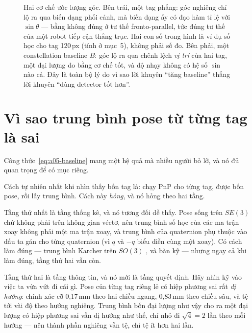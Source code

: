 \documentclass[../../marker.tex]{subfiles}
\begin{document}
\begin{figure}[H]
\caption{Hai cơ chế ước lượng góc. Bên trái, một tag phẳng: góc nghiêng chỉ lộ ra qua biến dạng phối cảnh, mà biến dạng ấy có đạo hàm tỉ lệ với \(\sin\theta\) --- bằng không đúng ở tư thế fronto-parallel, tức đúng tư thế của một robot tiếp cận thẳng trục. Hai con số trong hình là ví dụ số học cho tag 120\,px (tính ở mục~5), không phải số đo. Bên phải, một constellation baseline \(B\): góc lộ ra qua chênh lệch \emph{vị trí} của hai tag, một đại lượng đo bằng cơ chế tốt, và độ nhạy không có hệ số \(\sin\) nào cả. Đây là toàn bộ lý do vì sao lời khuyên ``tăng baseline'' thắng lời khuyên ``dùng detector tốt hơn''.}
\label{fig:a05-hai-co-che}
\end{figure}

\section{Vì sao trung bình pose từ từng tag là sai}

Công thức~\eqref{eq:a05-baseline} mang một hệ quả mà nhiều người bỏ lỡ, và nó đủ quan trọng để có mục riêng.

Cách tự nhiên nhất khi nhìn thấy bốn tag là: chạy PnP cho từng tag, được bốn pose, rồi lấy trung bình. Cách này \emph{hỏng}, và nó hỏng theo hai tầng.

Tầng thứ nhất là tầng thống kê, và nó tương đối dễ thấy. Pose sống trên \(SE(3)\) chứ không phải trên không gian véctơ, nên trung bình số học của các ma trận xoay không phải một ma trận xoay, và trung bình của quaternion phụ thuộc vào dấu ta gán cho từng quaternion (vì \(q\) và \(-q\) biểu diễn cùng một xoay). Có cách làm đúng --- trung bình Karcher trên \(SO(3)\) \cite{moakher2002means}, và  bàn kỹ --- nhưng ngay cả khi làm đúng, tầng thứ hai vẫn còn.

Tầng thứ hai là tầng thông tin, và nó mới là tầng quyết định. Hãy nhìn kỹ vào việc ta vừa vứt đi cái gì. Pose của từng tag riêng lẻ có hiệp phương sai rất \emph{dị hướng}: chính xác cỡ 0,17\,mm theo hai chiều ngang, 0,83\,mm theo chiều sâu, và tệ tới vài độ theo hướng nghiêng. Trung bình bốn đại lượng như vậy cho ra một đại lượng có hiệp phương sai vẫn dị hướng như thế, chỉ nhỏ đi \(\sqrt{4} = 2\) lần theo mỗi hướng --- nên thành phần nghiêng vẫn tệ, chỉ tệ ít hơn hai lần.
\end{document}
